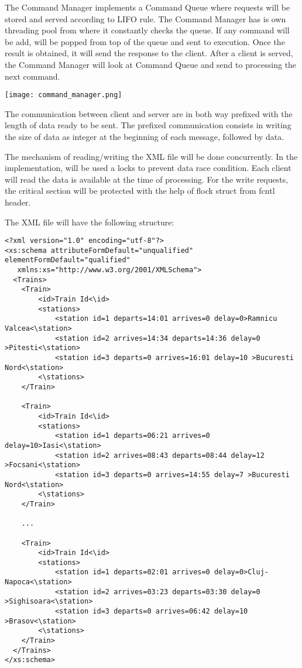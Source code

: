 \documentclass[runningheads]{llncs}
\begin{document}
\vspace{5mm}

The Command Manager implements a Command Queue where requests will be stored and served according to LIFO rule. The Command Manager has is  own threading pool from where it constantly checks the queue. If any command will be add, will be popped from top of the queue and sent to execution. Once the result is obtained, it will send the response to the client. After a client is served, the Command Manager will look at Command Queue and send to processing the next command.

\vspace{1.5mm}
\hspace{+1in}
\texttt{[image: command\_manager.png]}
\vspace{1.5mm}

The communication between client and server are in both way prefixed with the length of data ready to be sent. The prefixed communication consists in writing the size of data as integer at the beginning of each message, followed by data.


The mechanism of reading/writing the XML file will be done concurrently. In the implementation, will be used a locks to prevent data race condition.\cite{ref_url2} Each client will read the data is available at the time of processing. For the write requests, the critical section will be protected with the help of flock struct from fcntl header.

The XML file will have the following structure:

\begin{lstlisting}
<?xml version="1.0" encoding="utf-8"?>
<xs:schema attributeFormDefault="unqualified" elementFormDefault="qualified"
   xmlns:xs="http://www.w3.org/2001/XMLSchema">
  <Trains>
    <Train>
        <id>Train Id<\id>
        <stations>
            <station id=1 departs=14:01 arrives=0 delay=0>Ramnicu Valcea<\station>
            <station id=2 arrives=14:34 departs=14:36 delay=0 >Pitesti<\station>
            <station id=3 departs=0 arrives=16:01 delay=10 >Bucuresti Nord<\station>
        <\stations>
    </Train>
    
    <Train>
        <id>Train Id<\id>
        <stations>
            <station id=1 departs=06:21 arrives=0 delay=10>Iasi<\station>
            <station id=2 arrives=08:43 departs=08:44 delay=12 >Focsani<\station>
            <station id=3 departs=0 arrives=14:55 delay=7 >Bucuresti Nord<\station>
        <\stations>
    </Train>

    ...

    <Train>
        <id>Train Id<\id>
        <stations>
            <station id=1 departs=02:01 arrives=0 delay=0>Cluj-Napoca<\station>
            <station id=2 arrives=03:23 departs=03:30 delay=0 >Sighisoara<\station>
            <station id=3 departs=0 arrives=06:42 delay=10 >Brasov<\station>
        <\stations>
    </Train>
  </Trains>
</xs:schema>
\end{lstlisting}
\end{document}
